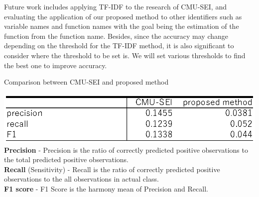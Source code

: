 \documentclass[JIP]{apris}
\begin{document}
Future work includes applying TF-IDF to the research of CMU-SEI, and evaluating the application of our proposed method to other identifiers such as variable names and function names with the goal being the estimation of the function from the function name. Besides, since the accuracy may change depending on the threshold for the TF-IDF method, it is also significant to consider where the threshold to be set is. We will set various thresholds to find the best one to improve accuracy.

\begin{table}[t]
 \caption{Comparison between CMU-SEI and proposed method\cite{joshi2016accuracy} \cite{sasaki2007truth} }
 \includegraphics[width=1.0\hsize]{image/cmu-kyu.eps} 
 \label{table2} 
 \noindent \textbf{Precision}  - Precision is the ratio of correctly predicted positive observations to the total predicted positive observations. \\
 \noindent \textbf{Recall} (Sensitivity) - Recall is the ratio of correctly predicted positive observations to the all observations in actual class.\\
 \noindent \textbf{F1 score} - F1 Score is the harmony mean of Precision and Recall.
\end{table}






\end{document}
